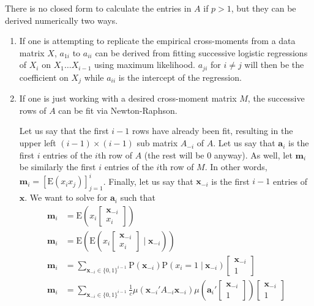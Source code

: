 \documentclass[11pt]{article}
\newcommand{\p}{\mathrm{P}}
\newcommand{\E}{\mathrm{E}}
\newcommand{\st}{ \; \big | \:}
\theoremstyle{definition}
\begin{document}
There is no closed form to calculate the entries in $A$ if $p>1$, but they can be derived numerically two ways.  
\begin{enumerate}
    \item If one is attempting to replicate the empirical cross-moments from a data matrix $X$, $a_{1i}$ to $a_{ii}$ can be derived from fitting successive logistic regressions of $X_i$ on $X_{1} \ldots X_{i-1}$ using maximum likelihood. $a_{ji}$ for $i\neq j$ will then be the coefficient on $X_j$ while $a_{ii}$ is the intercept of the regression.
    \item If one is just working with a desired cross-moment matrix $M$, the successive rows of $A$ can be fit via Newton-Raphson. \par
        Let us say that the first $i-1$ rows have already been fit, resulting in the upper left $(i-1)\times(i-1)$ sub matrix $A_{-i}$ of $A$. Let us say that $\mathbf a_i$ is the first $i$ entries of the $i$th row of $A$ (the rest will be 0 anyway). As well, let $\mathbf m_i$ be similarly the first $i$ entries of the $i$th row of $M$. In other words, $\mathbf{m}_i = [\E(x_i x_j)]_{j=1}^{i}$. Finally, let us say that $\mathbf x_{-i}$ is the first $i-1$ entries of $\mathbf x$. We want to solve for $\mathbf a_i$ such that
        \begin{align*}
            \mathbf m_i &= \E\left(x_i \left[\begin{array}{c} \mathbf x_{-i} \\ x_i \end{array}\right]\right) \\
            \mathbf m_i &= \E\left(\E\left(x_i \left[\begin{array}{c} \mathbf x_{-i} \\ x_i \end{array}\right]\;\bigg \vert\; \mathbf x_{-i}\right)\right)\\
            \mathbf m_i &= \sum_{\mathbf x_{-i} \in \{0,1\}^{i-1}} \p(\mathbf x_{-i})\p(x_i=1\st \mathbf x_{-i}) \left[\begin{array}{c} \mathbf x_{-i} \\ 1 \end{array}\right] \\
    \mathbf m_i &= \sum_{\mathbf x_{-i} \in \{0,1\}^{i-1}} \frac{1}{c}\mu\left(\mathbf x_{-i}'A_{-i}\mathbf x_{-i}\right) \mu\left(\mathbf{a}_i'\left[\begin{array}{c} \mathbf x_{-i} \\ 1 \end{array}\right]\right)\left[\begin{array}{c} \mathbf x_{-i} \\ 1 \end{array}\right] \\

\end{align*}
\end{enumerate}
\end{document}
